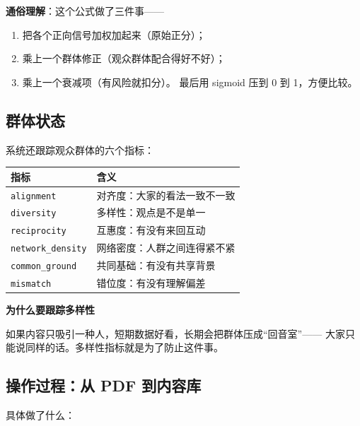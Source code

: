 \documentclass[UTF8,a4paper,11pt]{ctexart}
\newenvironment{explainbox}[1]
{\begin{center}\begin{minipage}{0.94\textwidth}\colorbox{boxbg}{\parbox{0.92\textwidth}{\textbf{#1}\par\vspace{2pt}}}}
{\end{minipage}\end{center}}
\newcommand{\sym}[1]{\texttt{#1}}
\begin{document}
\textbf{通俗理解}：这个公式做了三件事——
\begin{enumerate}[leftmargin=1.6em]
\item 把各个正向信号加权加起来（原始正分）；
\item 乘上一个群体修正（观众群体配合得好不好）；
\item 乘上一个衰减项（有风险就扣分）。
最后用 sigmoid 压到 0 到 1，方便比较。
\end{enumerate}

\subsection{群体状态}

系统还跟踪观众群体的六个指标：

\begin{center}
\begin{tabular}{p{4.6cm}p{9.2cm}}
\toprule
\textbf{指标} & \textbf{含义} \\
\midrule
\sym{alignment} & 对齐度：大家的看法一致不一致 \\
\sym{diversity} & 多样性：观点是不是单一 \\
\sym{reciprocity} & 互惠度：有没有来回互动 \\
\sym{network\_density} & 网络密度：人群之间连得紧不紧 \\
\sym{common\_ground} & 共同基础：有没有共享背景 \\
\sym{mismatch} & 错位度：有没有理解偏差 \\
\bottomrule
\end{tabular}
\end{center}

\begin{explainbox}{为什么要跟踪多样性}
如果内容只吸引一种人，短期数据好看，长期会把群体压成“回音室”——
大家只能说同样的话。多样性指标就是为了防止这件事。
\end{explainbox}

\subsection{操作过程：从 PDF 到内容库}

具体做了什么：
\end{document}
